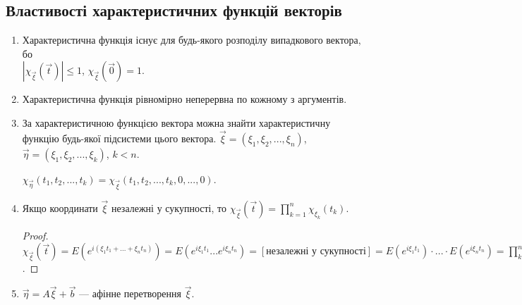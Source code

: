 \subsection{Властивості характеристичних функцій векторів}
\begin{enumerate}
    \item Характеристична функція існує для будь-якого розподілу випадкового вектора, бо \\
    $\left| \chi_{\vec{\xi}}(\vec{t})\right| \leq 1$, $\chi_{\vec{\xi}}(\vec{0}) = 1$.
    \item Характеристична функція рівномірно неперервна по кожному з аргументів.
    \item За характеристичною функцією вектора можна знайти 
    характеристичну функцію будь-якої підсистеми цього вектора.
    $\vec{\xi} = (\xi_1, \xi_2, ..., \xi_n)$, $\vec{\eta} = (\xi_1, \xi_2, ..., \xi_k)$, $k<n$.

    $\chi_{\vec{\eta}}(t_1, t_2, ..., t_k) = \chi_{\vec{\xi}}(t_1, t_2, ..., t_k, 0, ..., 0)$.
    \item Якщо координати $\vec{\xi}$ незалежні у сукупності, то $\chi_{\vec{\xi}}(\vec{t}) = \prod\limits_{k=1}^n \chi_{\xi_k}(t_k)$.
    \begin{proof}
        $\chi_{\vec{\xi}}(\vec{t}) = E\left( e^{i(\xi_1 t_1 + ... + \xi_n t_n)}\right) = 
        E\left( e^{i\xi_1 t_1} ... e^{i\xi_n t_n}\right) = \left[ \text{незалежні у сукупності}\right] =
        E\left( e^{i\xi_1 t_1}\right) \cdot ... \cdot E\left( e^{i\xi_n t_n}\right) = \prod\limits_{k=1}^n \chi_{\xi_k}(t_k)$.
    \end{proof}
    \item $\vec{\eta} = A\vec{\xi} + \vec{b}$ --- афінне перетворення $\vec{\xi}$.


\end{enumerate}
